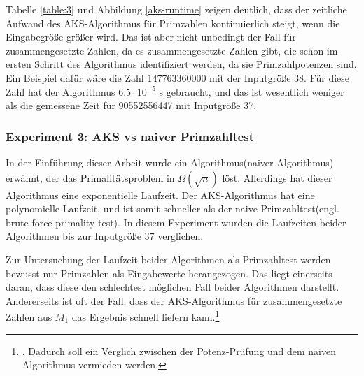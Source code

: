 \documentclass[12pt,oneside]{article}
\theoremstyle{remark}
\theoremstyle{definition}
\begin{document}
Tabelle \ref{table:3} und Abbildung \ref{aks-runtime} zeigen deutlich, dass der zeitliche Aufwand des AKS-Algorithmus für Primzahlen kontinuierlich steigt, wenn die Eingabegröße größer wird. Das ist aber nicht unbedingt der Fall für zusammengesetzte Zahlen, da es zusammengesetzte Zahlen gibt, die schon im ersten Schritt des Algorithmus identifiziert werden, da sie Primzahlpotenzen sind. Ein Beispiel dafür wäre die Zahl 147763360000 mit der Inputgröße 38. Für diese Zahl hat der Algorithmus $6.5 \cdot 10^{-5}$ s gebraucht, und das ist wesentlich weniger als die gemessene Zeit für 90552556447 mit Inputgröße 37.


\subsubsection{Experiment 3: AKS vs naiver Primzahltest}
In der Einführung dieser Arbeit wurde ein Algorithmus(naiver Algorithmus) erwähnt, der das Primalitätsproblem in $\Omega(\sqrt{n})$ löst. Allerdings hat dieser Algorithmus eine exponentielle Laufzeit. Der AKS-Algorithmus hat eine polynomielle Laufzeit, und ist somit schneller als der naive Primzahltest(engl. brute-force primality test). In diesem Experiment wurden die Laufzeiten beider Algorithmen bis zur Inputgröße $37$ verglichen.  

Zur Untersuchung der Laufzeit beider Algorithmen als Primzahltest werden bewusst nur Primzahlen als Eingabewerte herangezogen. Das liegt einerseits daran, dass diese den schlechtest möglichen Fall beider Algorithmen darstellt. Andererseits ist oft der Fall, dass der AKS-Algorithmus für zusammengesetzte Zahlen aus $M_1$ das Ergebnis  schnell liefern kann.\footnote{. Dadurch soll ein Verglich zwischen der Potenz-Prüfung und dem naiven Algorithmus vermieden werden.}\newline
\end{document}
